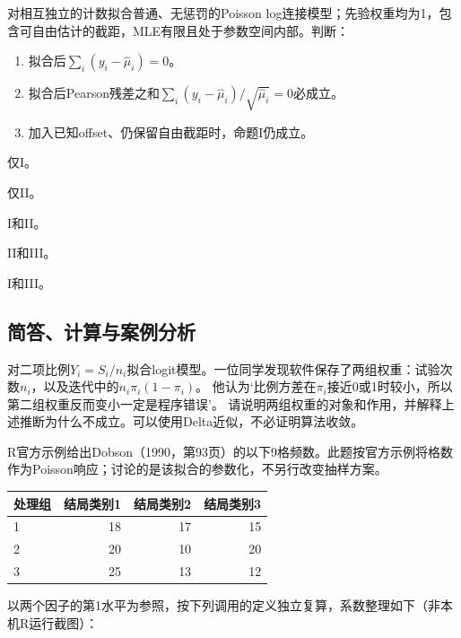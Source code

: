 \par\noindent\begin{minipage}{\linewidth}
对相互独立的计数拟合普通、无惩罚的Poisson log连接模型；先验权重均为1，包含可自由估计的截距，MLE有限且处于参数空间内部。判断：
\begin{enumerate}[label=\Roman*.]
\item 拟合后$\sum_i(y_i-\hat\mu_i)=0$。
\item 拟合后Pearson残差之和$\sum_i(y_i-\hat\mu_i)/\sqrt{\hat\mu_i}=0$必成立。
\item 加入已知offset、仍保留自由截距时，命题I仍成立。
\end{enumerate}
\begin{choices}
\item 仅I。
\item 仅II。
\item I和II。
\item II和III。
\item I和III。
\end{choices}
\end{minipage}\par\medskip

\subsection{简答、计算与案例分析}

对二项比例$Y_i=S_i/n_i$拟合logit模型。一位同学发现软件保存了两组权重：试验次数$n_i$，以及迭代中的$n_i\pi_i(1-\pi_i)$。
他认为‘比例方差在$\pi_i$接近0或1时较小，所以第二组权重反而变小一定是程序错误’。
请说明两组权重的对象和作用，并解释上述推断为什么不成立。可以使用Delta近似，不必证明算法收敛。

R官方示例给出Dobson（1990，第93页）的以下9格频数。此题按官方示例将格数作为Poisson响应；讨论的是该拟合的参数化，不另行改变抽样方案。
\begin{center}\begin{tabular}{lrrr}\toprule
处理组&结局类别1&结局类别2&结局类别3\\\midrule
1&18&17&15\\2&20&10&20\\3&25&13&12\\\bottomrule\end{tabular}\end{center}
以两个因子的第1水平为参照，按下列调用的定义独立复算，系数整理如下（非本机R运行截图）：


